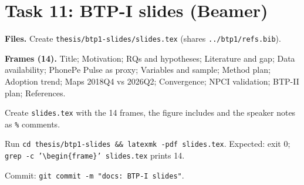 \documentclass[10pt,a4paper]{article}
\newcommand{\f}[1]{\texttt{#1}}
\begin{document}
\section{Task 11: BTP-I slides (Beamer)}
\textbf{Files.} Create \f{thesis/btp1-slides/slides.tex} (shares \f{../btp1/refs.bib}).

\textbf{Frames (14).} Title; Motivation; RQs and hypotheses; Literature and gap; Data availability; PhonePe Pulse
as proxy; Variables and sample; Method plan; Adoption trend; Maps 2018Q4 vs 2026Q2; Convergence; NPCI
validation; BTP-II plan; References.

\begin{steps}
\item Create \f{slides.tex} with the 14 frames, the figure includes and the speaker notes as \f{\%} comments.
\item Run \f{cd thesis/btp1-slides \&\& latexmk -pdf slides.tex}. Expected: exit 0;
      \f{grep -c '\textbackslash begin\{frame\}' slides.tex} prints 14.
\item Commit: \f{git commit -m "docs: BTP-I slides"}.
\end{steps}
\end{document}
